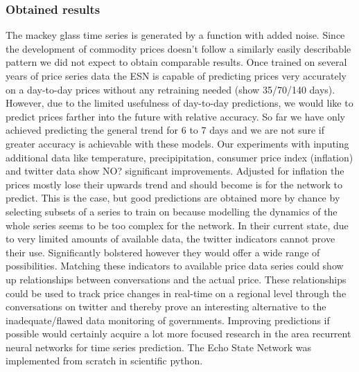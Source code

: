 \subsubsection*{Obtained results}
The mackey glass time series is generated by a function with added noise. Since the development of commodity prices doesn't follow a similarly easily describable pattern we did not expect to obtain comparable results. Once trained on several years of price series data the ESN is capable of predicting prices very accurately on a day-to-day prices without any retraining needed (show 35/70/140 days). However, due to the limited usefulness of day-to-day predictions, we would like to predict prices farther into the future with relative accuracy. So far we have only achieved predicting the general trend for 6 to 7 days and we are not sure if greater accuracy is achievable with these models. Our experiments with inputing additional data like temperature, precipipitation, consumer price index (inflation) and twitter data show NO? significant improvements. Adjusted for inflation the prices mostly lose their upwards trend and should become is for the network to predict. This is the case, but good predictions are obtained more by chance by selecting subsets of a series to train on because modelling the dynamics of the whole series seems to be too complex for the network. In their current state, due to very limited amounts of available data, the twitter indicators cannot prove their use. Significantly bolstered however they would offer a wide range of possibilities. Matching these indicators to available price data series could show up relationships between conversations and the actual price. These relationships could be used to track price changes in real-time on a regional level through the conversations on twitter and thereby prove an interesting alternative to the inadequate/flawed data monitoring of governments. Improving predictions if possible would certainly acquire a lot more focused research in the area recurrent neural networks for time series prediction. The Echo State Network was implemented from scratch in scientific python.

